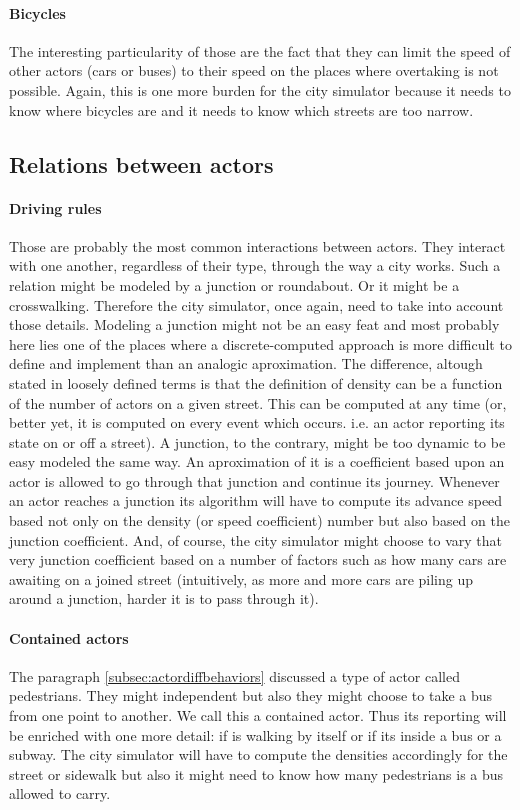 \documentclass[a4paper,12pt,twoside]{book}
\begin{document}
\paragraph{Bicycles} The interesting particularity of those are the fact that they can limit the speed of other actors (cars or buses) to their speed on the places where overtaking is not possible. Again, this is one more burden for the city simulator because it needs to know where bicycles are and it needs to know which streets are too narrow.

\subsection{Relations between actors}
\label{subsec:relationsbetweenactors}

\paragraph{Driving rules} Those are probably the most common interactions between actors. They interact with one another, regardless of their type, through the way a city works. Such a relation might be modeled by a junction or roundabout. Or it might be a crosswalking. Therefore the city simulator, once again, need to take into account those details. Modeling a junction might not be an easy feat and most probably here lies one of the places where a discrete-computed approach is more difficult to define and implement than an analogic aproximation. The difference, altough stated in loosely defined terms is that the definition of density can be a function of the number of actors on a given street. This can be computed at any time (or, better yet, it is computed on every event which occurs. i.e. an actor reporting its state on or off a street). A junction, to the contrary, might be too dynamic to be easy modeled the same way. An aproximation of it is a coefficient based upon an actor is allowed to go through that junction and continue its journey. Whenever an actor reaches a junction its algorithm will have to compute its advance speed based not only on the density (or speed coefficient) number but also based on the junction coefficient. And, of course, the city simulator might choose to vary that very junction coefficient based on a number of factors such as how many cars are awaiting on a joined street (intuitively, as more and more cars are piling up around a junction, harder it is to pass through it).

\paragraph{Contained actors}
The paragraph \ref{subsec:actordiffbehaviors} discussed a type of actor called pedestrians. They might independent but also they might choose to take a bus from one point to another. We call this a contained actor. Thus its reporting will be enriched with one more detail: if is walking by itself or if its inside a bus or a subway. The city simulator will have to compute the densities accordingly for the street or sidewalk but also it might need to know how many pedestrians is a bus allowed to carry.
\end{document}
